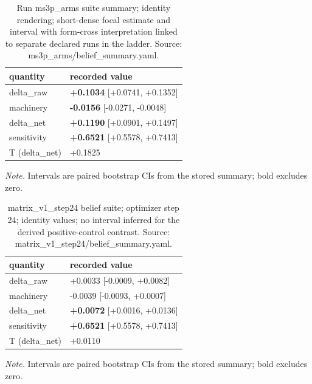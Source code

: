 \documentclass[10pt]{article}
\begin{document}
\begin{table}[H]
\centering
\footnotesize
\caption{ Run ms3p\_arms suite summary; identity rendering; short-dense focal estimate and interval with form-cross interpretation linked to separate declared runs in the ladder. Source: ms3p\_arms/belief\_summary.yaml. }
\label{tab:belief_transfer}



\begin{tabular}{ ll }
\toprule
quantity & recorded value \\
\midrule

delta\_raw & \textbf{+0.1034} [+0.0741, +0.1352] \\

machinery & \textbf{-0.0156} [-0.0271, -0.0048] \\

delta\_net & \textbf{+0.1190} [+0.0901, +0.1497] \\

sensitivity & \textbf{+0.6521} [+0.5578, +0.7413] \\

T (delta\_net) & +0.1825 \\

\bottomrule
\end{tabular}

\par\footnotesize\emph{Note.} Intervals are paired bootstrap CIs from the stored summary; bold excludes zero.
\end{table}


\begin{table}[H]
\centering
\footnotesize
\caption{ matrix\_v1\_step24 belief suite; optimizer step 24; identity values; no interval inferred for the derived positive-control contrast. Source: matrix\_v1\_step24/belief\_summary.yaml. }
\label{tab:belief_transfer}



\begin{tabular}{ ll }
\toprule
quantity & recorded value \\
\midrule

delta\_raw & +0.0033 [-0.0009, +0.0082] \\

machinery & -0.0039 [-0.0093, +0.0007] \\

delta\_net & \textbf{+0.0072} [+0.0016, +0.0136] \\

sensitivity & \textbf{+0.6521} [+0.5578, +0.7413] \\

T (delta\_net) & +0.0110 \\

\bottomrule
\end{tabular}

\par\footnotesize\emph{Note.} Intervals are paired bootstrap CIs from the stored summary; bold excludes zero.
\end{table}
\end{document}
